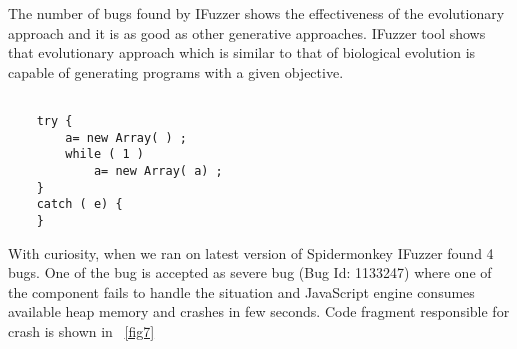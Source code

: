 \documentclass{acm_proc_article-sp}
\begin{document}
\indent The number of bugs found by IFuzzer shows the effectiveness of the evolutionary approach and it is as good as other generative approaches. 
IFuzzer tool shows that evolutionary approach which is similar to that of biological evolution is capable of generating programs with a given objective.\\
\begin{lstlisting}

	try { 
		a= new Array( ) ; 
		while ( 1 ) 
			a= new Array( a) ; 
	} 
	catch ( e) { 	
	} 
\end{lstlisting}

\indent With curiosity, when we ran on latest version of Spidermonkey IFuzzer found  4 bugs. One of the bug is accepted as severe bug (Bug Id: 1133247) \cite{Misc01} where one of the component fails to handle the situation and JavaScript engine consumes available heap memory and crashes in few seconds. Code fragment responsible for crash is shown in ~\autoref{fig7}
\end{document}
